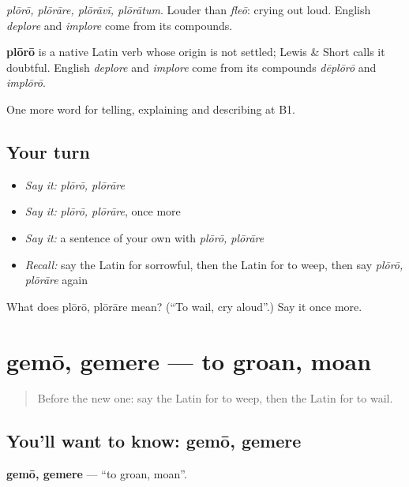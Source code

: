\emph{plōrō, plōrāre, plōrāvī, plōrātum}. Louder than \emph{fleō}: crying out loud. English \emph{deplore} and \emph{implore} come from its compounds.

\begin{cousinweb}
\textbf{plōrō} is a native Latin verb whose origin is not settled; Lewis \& Short calls it doubtful. English \emph{deplore} and \emph{implore} come from its compounds \emph{dēplōrō} and \emph{implōrō}.
\end{cousinweb}

\begin{grammarlens}[title={What you've built}]
One more word for telling, explaining and describing at B1.
\end{grammarlens}

\subsection*{Your turn}
\begin{itemize}
\raggedright
  \item \emph{Say it:} \emph{plōrō, plōrāre}
  \item \emph{Say it:} \emph{plōrō, plōrāre}, once more
  \item \emph{Say it:} a sentence of your own with \emph{plōrō, plōrāre}
  \item \emph{Recall:} say the Latin for sorrowful, then the Latin for to weep, then say \emph{plōrō, plōrāre} again
\end{itemize}

\begin{tcolorbox}[breakable,colback=teal!4,colframe=teal!35!black,title={Before you move on}]
What does plōrō, plōrāre mean? (\textquotedblleft{}To wail, cry aloud\textquotedblright{}.) Say it once more.
\end{tcolorbox}
\section[gemō, gemere]{gemō, gemere — to groan, moan}

\label{lesson:LA-C491-gemo}



\begin{quote}
Before the new one: say the Latin for to weep, then the Latin for to wail.
\end{quote}

\subsection*{You'll want to know: gemō, gemere}
\textbf{gemō, gemere} — \textquotedblleft{}to groan, moan\textquotedblright{}.

